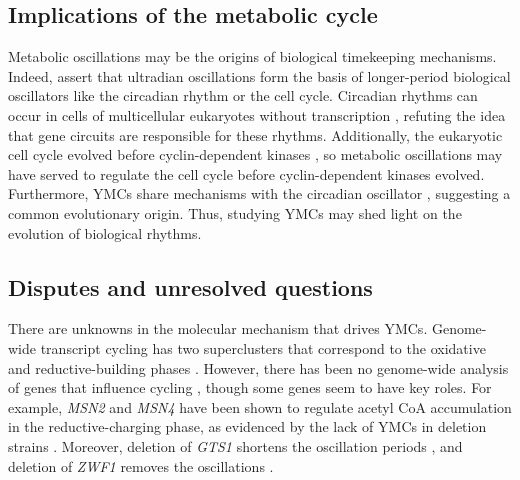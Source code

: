 \subsection{Implications of the metabolic cycle}
\label{subsec:intro-ymc-implications}

Metabolic oscillations may be the origins of biological timekeeping mechanisms.
Indeed, \citet{lloydRedoxRhythmicityClocks2007} assert that ultradian oscillations form the basis of longer-period biological oscillators like the circadian rhythm or the cell cycle.
Circadian rhythms can occur in cells of multicellular eukaryotes without transcription \citep{oneillCircadianRhythmsPersist2011}, refuting the idea that gene circuits are responsible for these rhythms.
Additionally, the eukaryotic cell cycle evolved before cyclin-dependent kinases \citep{papagiannakisAutonomousMetabolicOscillations2017}, so metabolic oscillations may have served to regulate the cell cycle before cyclin-dependent kinases evolved.
Furthermore, YMCs share mechanisms with the circadian oscillator \citep{caustonMetabolicCyclesYeast2015,arataQuantitativeStudiesCellDivision2019}, suggesting a common evolutionary origin.
Thus, studying YMCs may shed light on the evolution of biological rhythms.

\subsection{Disputes and unresolved questions}
\label{subsec:intro-ymc-unresolved}


There are unknowns in the molecular mechanism that drives YMCs.
Genome-wide transcript cycling has two superclusters that correspond to the oxidative and reductive-building phases \citep{machneYinYangYeast2012}.
However, there has been no genome-wide analysis of genes that influence cycling \citep{mellorMolecularBasisMetabolic2016}, though some genes seem to have key roles.
For example, \emph{MSN2} and \emph{MSN4} have been shown to regulate acetyl CoA accumulation in the reductive-charging phase, as evidenced by the lack of YMCs in deletion strains \citep{kuangMsn2RegulateExpression2017}.
Moreover, deletion of \emph{GTS1} shortens the oscillation periods \citep{lloydUltradianMetronomeTimekeeper2005},
and deletion of \emph{ZWF1} removes the oscillations \citep{tuCyclicChangesMetabolic2007}.

